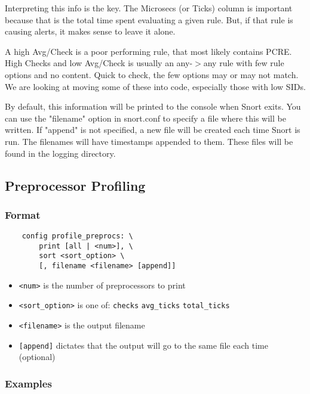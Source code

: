 \documentclass[english]{report}
\begin{document}
Interpreting this info is the key.  The Microsecs (or Ticks) column is
important because that is the total time spent evaluating a given rule.  But,
if that rule is causing alerts, it makes sense to leave it alone.

A high Avg/Check is a poor performing rule, that most likely contains PCRE.
High Checks and low Avg/Check is usually an any-$>$any rule with few rule
options and no content.  Quick to check, the few options may or may not match.
We are looking at moving some of these into code, especially those with low
SIDs.

By default, this information will be printed to the console when Snort exits.
You can use the "filename" option in snort.conf to specify a file where this
will be written. If "append" is not specified, a new file will be created each
time Snort is run. The filenames will have timestamps appended to them. These
files will be found in the logging directory.

\subsection{Preprocessor Profiling}
\label{preproc profiling}

\subsubsection{Format}

\begin{verbatim}
    config profile_preprocs: \
        print [all | <num>], \
        sort <sort_option> \
        [, filename <filename> [append]]
\end{verbatim}

\begin{itemize}
\item \texttt{<num>} is the number of preprocessors to print
\item \texttt{<sort\_option>} is one of:
\subitem \texttt{checks}
\subitem \texttt{avg\_ticks}
\subitem \texttt{total\_ticks}
\item \texttt{<filename>} is the output filename
\item \texttt{[append]} dictates that the output will go to the same file each time (optional)
\end{itemize}

\subsubsection{Examples}
\end{document}
